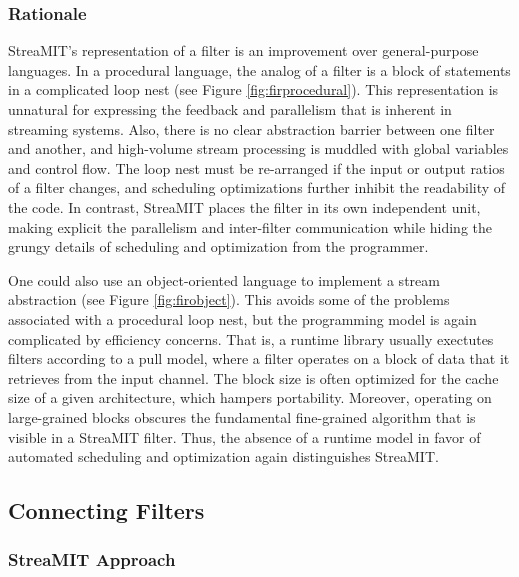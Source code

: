 \subsubsection{Rationale}

StreaMIT's representation of a filter is an improvement over
general-purpose languages.  In a procedural language, the analog of a
filter is a block of statements in a complicated loop nest (see Figure
\ref{fig:firprocedural}).  This representation is unnatural for expressing
the feedback and parallelism that is inherent in streaming systems.
Also, there is no clear abstraction barrier between one filter and
another, and high-volume stream processing is muddled with global
variables and control flow.  The loop nest must be re-arranged if the
input or output ratios of a filter changes, and scheduling
optimizations further inhibit the readability of the code.  In
contrast, StreaMIT places the filter in its own independent unit,
making explicit the parallelism and inter-filter communication while
hiding the grungy details of scheduling and optimization from the
programmer.

One could also use an object-oriented language to implement a stream
abstraction (see Figure \ref{fig:firobject}).  This avoids some of the
problems associated with a procedural loop nest, but the programming
model is again complicated by efficiency concerns.  That is, a runtime
library usually exectutes filters according to a pull model, where a
filter operates on a block of data that it retrieves from the input
channel.  The block size is often optimized for the cache size of a
given architecture, which hampers portability.  Moreover, operating on
large-grained blocks obscures the fundamental fine-grained algorithm
that is visible in a StreaMIT filter.  Thus, the absence of a runtime
model in favor of automated scheduling and optimization again
distinguishes StreaMIT.

\subsection{Connecting Filters}
\label{sec:connecting}

\subsubsection{StreaMIT Approach}

